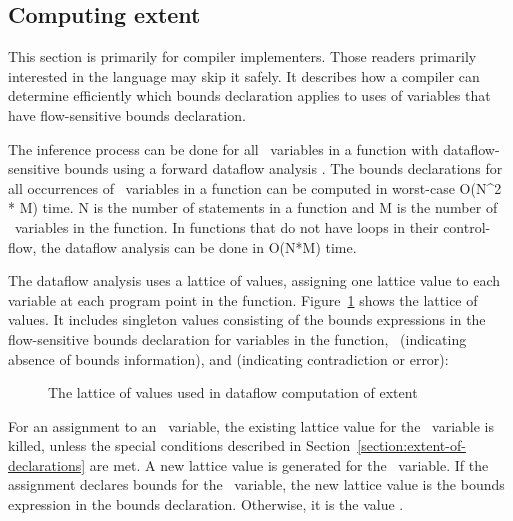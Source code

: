 \subsection{Computing extent}
\label{section:computing-extent}

This section is primarily for compiler implementers. Those readers
primarily interested in the language may skip it safely. It describes
how a compiler can determine efficiently which bounds declaration
applies to uses of variables that have flow-sensitive bounds
declaration.

The inference process can be done for all \arrayptr\ variables
in a function with dataflow-sensitive bounds using a forward dataflow
analysis \cite{Aho2007}. The bounds declarations for all occurrences of
\arrayptr\ variables in a function can be computed in
worst-case O(N\^{}2 * M) time. N is the number of statements in a
function and M is the number of \arrayptr\ variables in the
function. In functions that do not have loops in their control-flow, the
dataflow analysis can be done in O(N*M) time.

The dataflow analysis uses a lattice of values, assigning one lattice
value to each variable at each program point in the function.  
Figure~\ref{fig:extent-dataflow-lattice} shows the lattice of values.  
It includes singleton values consisting of the bounds
expressions in the flow-sensitive bounds declaration for variables in
the function, \boundsunknown\ (indicating absence of bounds
information), and  (indicating contradiction or error):

\begin{figure}
\begin{center}
\end{center}
\caption{The lattice of values used in dataflow computation of extent}
\label{fig:extent-dataflow-lattice}
\end{figure}
 
For an assignment to an \arrayptr\ variable, the existing
lattice value for the \arrayptr\ variable is killed, unless
the special conditions described in Section~\ref{section:extent-of-declarations}
are met. 
A new lattice value is generated for the \arrayptr\ variable. If the
assignment declares bounds for the \arrayptr\ variable, the new
lattice value is the bounds expression in the bounds declaration.
Otherwise, it is the value \boundsunknown.


